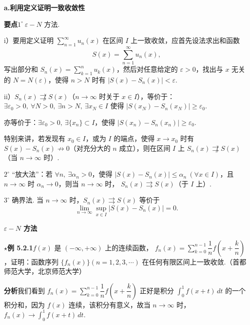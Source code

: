 \documentclass[UTF8,12pt,a4paper,fontset=fandol]{ctexart}
\begin{document}
\noindent\textbf{a.\quad 利用定义证明一致收敛性}

\noindent\textbf{要点}\quad $1^\circ\ \varepsilon-N$ 方法.

i）要用定义证明 $\displaystyle\sum_{n=1}^{\infty}u_n(x)$ 在区间 $I$ 上一致收敛，应首先设法求出和函数
\[
  S(x)=\sum_{n=1}^{\infty}u_n(x),
\]
写出部分和 $S_n(x)=\displaystyle\sum_{k=1}^n u_k(x)$，然后对任意给定的 $\varepsilon>0$，找出与 $x$ 无关的
$N=N(\varepsilon)$，使得 $n>N$ 时有 $|S(x)-S_n(x)|<\varepsilon$.

ii）$S_n(x)\not\rightrightarrows S(x)$（$n\to\infty$ 时关于 $x\in I$），等价于：
$\exists\varepsilon_0>0,\ \forall N>0,\ \exists n>N,\ \exists x_N\in I$ 使得
$|S(x_N)-S_n(x_N)|\ge\varepsilon_0$.

亦等价于：$\exists\varepsilon_0>0,\ \exists\{x_n\}\subset I$，使得
$|S(x_n)-S_n(x_n)|\ge\varepsilon_0$.

特别来讲，若发现有 $x_0\in I$，或为 $I$ 的端点，使得 $x\to x_0$ 时有
$S(x)-S_n(x)\not\to0$（对充分大的 $n$ 成立），则在区间 $I$ 上
$S_n(x)\not\rightrightarrows S(x)$（当 $n\to\infty$ 时）.

$2^\circ$ “放大法”：若 $\forall n,\ \exists\alpha_n>0$，使得
$|S(x)-S_n(x)|\le\alpha_n\ (\forall x\in I)$，且 $n\to\infty$ 时 $\alpha_n\to0$，则当 $n\to\infty$ 时，
$S_n(x)\rightrightarrows S(x)$（于 $I$ 上）.

$3^\circ$ 确界法. 当 $n\to\infty$ 时，$S_n(x)\rightrightarrows S(x)$ 等价于
\[
  \lim_{n\to\infty}\sup_{x\in I}|S(x)-S_n(x)|=0.
\]

\noindent\textbf{$\varepsilon-N$ 方法}

\noindent\textbf{$\star$例 5.2.1}\quad $f(x)$ 是 $(-\infty,+\infty)$ 上的连续函数，
$f_n(x)=\displaystyle\sum_{k=0}^{n-1}\dfrac1n f\left(x+\dfrac{k}{n}\right)$，证明：函数序列
$\{f_n(x)\}(n=1,2,3,\cdots)$ 在任何有限区间上一致收敛.（首都师范大学，北京师范大学）

\noindent\textbf{分析}\quad 我们看到
$f_n(x)=\displaystyle\sum_{k=0}^{n-1}\dfrac1n f\left(x+\dfrac{k}{n}\right)$ 正好是积分
$\displaystyle\int_0^1f(x+t)\,dt$ 的一个积分和，因为 $f(x)$ 连续，该积分有意义，故当
$n\to\infty$ 时，$f_n(x)\to\displaystyle\int_0^1f(x+t)\,dt$.
\end{document}
